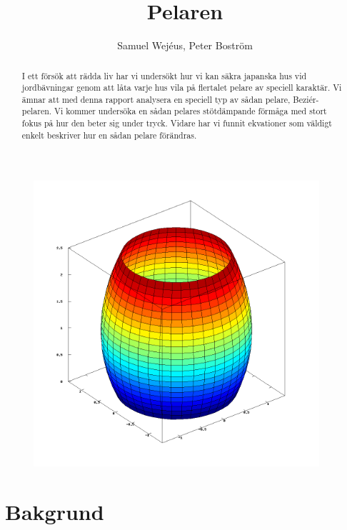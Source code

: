 \documentclass[a4paper,10pt]{article}
\title{Pelaren}
\author{Samuel Wejéus, Peter Boström}
\begin{document}
\setlength{\parindent}{0mm}
\setlength{\parskip}{3mm}

\maketitle

\thispagestyle{empty}

\vspace{2cm}

\begin{figure}[htp]
\centering
\includegraphics[height=300pt]{fig2}
\end{figure}

\newpage

\thispagestyle{empty}
\begin{abstract}
	\noindent I ett försök att rädda liv har vi undersökt hur vi kan säkra japanska hus vid jordbävningar genom att låta varje hus vila på flertalet pelare av speciell karaktär. Vi ämnar att med denna rapport analysera en speciell typ av sådan pelare, Beziér-pelaren. Vi kommer undersöka en sådan pelares stötdämpande förmåga med stort fokus på hur den beter sig under tryck. Vidare har vi funnit ekvationer som väldigt enkelt beskriver hur en sådan pelare förändras.
\end{abstract}

\newpage

\setcounter{page}{1}

\tableofcontents
\newpage

\section{Bakgrund}
\end{document}
